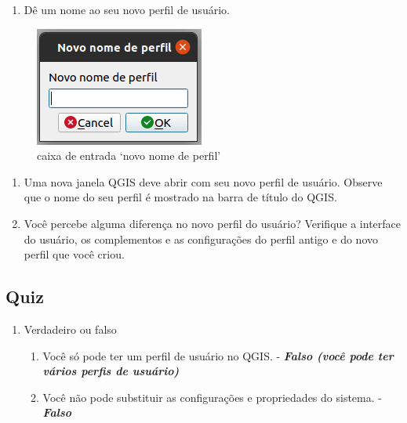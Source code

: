\documentclass[
]{krantz}
\providecommand{\tightlist}{%
  \setlength{\itemsep}{0pt}\setlength{\parskip}{0pt}}
\begin{document}
\begin{enumerate}
\def\labelenumi{\arabic{enumi}.}
\setcounter{enumi}{1}
\tightlist
\item
  Dê um nome ao seu novo perfil de usuário.
\end{enumerate}

\begin{figure}
\centering
\includegraphics{media/modulo1/user-profiles-3.png}
\caption{caixa de entrada `novo nome de perfil'}
\end{figure}

\begin{enumerate}
\def\labelenumi{\arabic{enumi}.}
\setcounter{enumi}{2}
\item
  Uma nova janela QGIS deve abrir com seu novo perfil de usuário. Observe que o nome do seu perfil é mostrado na barra de título do QGIS.
\item
  Você percebe alguma diferença no novo perfil do usuário? Verifique a interface do usuário, os complementos e as configurações do perfil antigo e do novo perfil que você criou.
\end{enumerate}

\hypertarget{quiz-5}{%
\subsection{Quiz}\label{quiz-5}}

\begin{enumerate}
\def\labelenumi{\arabic{enumi}.}
\tightlist
\item
  Verdadeiro ou falso

  \begin{enumerate}
  \def\labelenumii{\arabic{enumii}.}
  \tightlist
  \item
    Você só pode ter um perfil de usuário no QGIS. - \textbf{\emph{Falso (você pode ter vários perfis de usuário)}}
  \item
    Você não pode substituir as configurações e propriedades do sistema. - \textbf{\emph{Falso}}
  \end{enumerate}
\end{enumerate}
\end{document}
